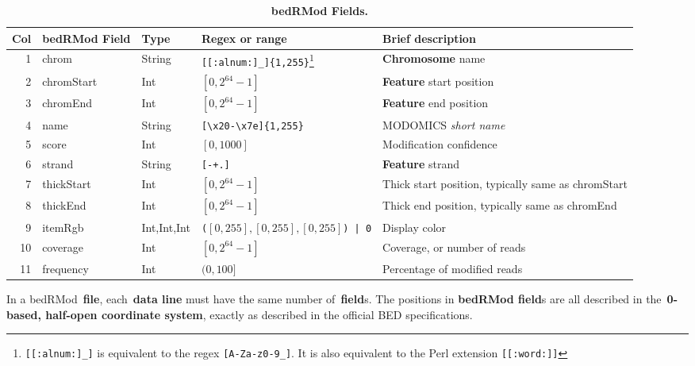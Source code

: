 \documentclass[11pt]{article}
\begin{document}
\begin{savenotes}
  \begin{table}
    \begin{adjustwidth}{-0.5in}{-0.5in}
      \begin{tabularx}{\linewidth}{r l l l L}
        \toprule
        Col & \acs{bedRMod} Field & Type & Regex or range & Brief description \\
        & \textsf{chrom}
        & String
        & \texttt{[[:alnum:]\_]\{1,255\}}\footnote{\texttt{[[:alnum:]\_]} is equivalent to the \ac{regex} \texttt{[A-Za-z0-9\_]}. %
        It is also equivalent to the Perl extension \texttt{[[:word:]]}}
        & \textbf{Chromosome} name \\
        2 & \textsf{chromStart} & Int & $[0, 2^{64}-1]$ & \textbf{Feature} start position \\
        3 & \textsf{chromEnd} & Int & $[0, 2^{64} -1]$ & \textbf{Feature} end position \\
        4 
        & \textsf{name} 
        & String 
        & \texttt{[{\textbackslash}x20-{\textbackslash}x7e]\{1,255\}} 
        & MODOMICS \emph{short name} \\
        5 & \textsf{score} & Int & $[0, 1000]$ & Modification confidence \\
        6 & \textsf{strand} & String & \texttt{[-+.]} & \textbf{Feature} strand \\
        7 & \textsf{thickStart} & Int & $[0, 2^{64}-1]$ & Thick start position, typically same as \textsf{chromStart} \\
        8 & \textsf{thickEnd} & Int & $[0, 2^{64}-1]$ & Thick end position, typically same as \textsf{chromEnd} \\
        9 & \textsf{itemRgb} & Int,Int,Int & \texttt{(}$[0, 255], [0,255], [0,255]$\texttt{) | 0} & Display color \\ %
        10 & \textsf{coverage} & Int &  $[0, 2^{64}-1]$ & Coverage, or number of reads \\
        11 & \textsf{frequency} & Int & $(0, 100]$ & Percentage of modified reads \\
        \bottomrule
      \end{tabularx}
    \end{adjustwidth}
    \caption{\textbf{\acs{bedRMod} Fields.}}\label{tab:fields}
  \end{table}
\end{savenotes}

In a \ac{bedRMod}~\textbf{file}, each~\textbf{data line} must have the same number of~\textbf{field}s.
The positions in \textbf{\acs{bedRMod} field}s are all described in the~\textbf{0-based, half-open coordinate system}, exactly as 
described in the official \ac{BED} specifications.
\end{document}
